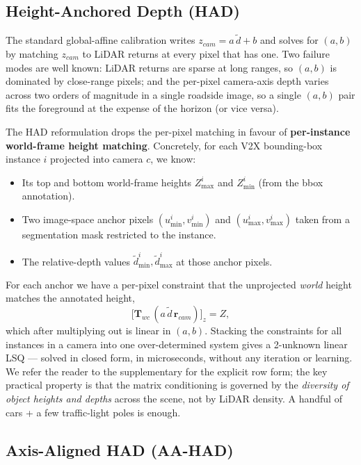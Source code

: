 \documentclass[10pt,twocolumn,letterpaper]{article}
\begin{document}
\subsection{Height-Anchored Depth (HAD)}
\label{sec:method-had}

The standard global-affine calibration \cite{midas3} writes
$z_{cam} = a\,\tilde{d} + b$ and solves for $(a, b)$ by matching $z_{cam}$
to LiDAR returns at every pixel that has one. Two failure modes are
well known: LiDAR returns are sparse at long ranges, so $(a, b)$ is
dominated by close-range pixels; and the per-pixel camera-axis depth
varies across two orders of magnitude in a single roadside image, so
a single $(a, b)$ pair fits the foreground at the expense of the
horizon (or vice versa).

The HAD reformulation drops the per-pixel matching in favour of
\textbf{per-instance world-frame height matching}. Concretely, for each
V2X bounding-box instance $i$ projected into camera $c$, we know:

\begin{itemize}
\item Its top and bottom world-frame heights $Z_{\max}^i$ and
$Z_{\min}^i$ (from the bbox annotation).
\item Two image-space anchor pixels $(u_{\min}^i, v_{\min}^i)$ and
$(u_{\max}^i, v_{\max}^i)$ taken from a segmentation mask
\cite{sam} restricted to the instance.
\item The relative-depth values $\tilde{d}_{\min}^i, \tilde{d}_{\max}^i$
at those anchor pixels.
\end{itemize}

For each anchor we have a per-pixel constraint that the unprojected
\emph{world} height matches the annotated height,
\begin{equation}
\bigl[\mathbf{T}_{wc}\,(a\,\tilde{d}\,\mathbf{r}_{cam})\bigr]_z = Z,
\label{eq:had-constraint}
\end{equation}
which after multiplying out is linear in $(a, b)$. Stacking the
constraints for all instances in a camera into one over-determined
system gives a 2-unknown linear LSQ — solved in closed form, in
microseconds, without any iteration or learning. We refer the reader
to the supplementary for the explicit row form; the key practical
property is that the matrix conditioning is governed by the
\emph{diversity of object heights and depths} across the scene, not by
LiDAR density. A handful of cars + a few traffic-light poles is enough.


\subsection{Axis-Aligned HAD (AA-HAD)}
\label{sec:method-aahad}
\end{document}
